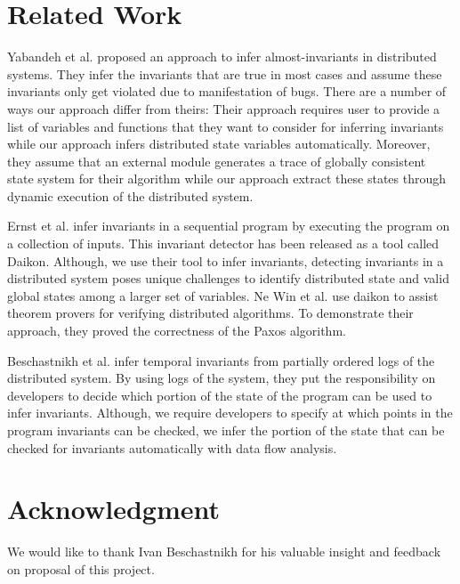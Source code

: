 \section{Related Work}

Yabandeh et al.\cite{yabandeh2011finding} proposed an approach to
infer almost-invariants in distributed systems. They infer the
invariants that are true in most cases and assume these invariants
only get violated due to manifestation of bugs. There are a number of
ways our approach differ from theirs: Their approach requires user to
provide a list of variables and functions that they want to consider
for inferring invariants while our approach infers distributed state
variables automatically. Moreover, they assume that an external module
generates a trace of globally consistent state system for their
algorithm while our approach extract these states through dynamic
execution of the distributed system.

Ernst et al.\cite{ernst2001dynamically} infer invariants in a
sequential program by executing the program on a collection of inputs.
This invariant detector has been released as a tool called
Daikon\cite{ernst2007daikon}. Although, we use their tool to infer
invariants, detecting invariants in a distributed system poses unique
challenges to identify distributed state and valid global states among
a larger set of variables. Ne Win et al.\cite{NeWinEGKL04} use daikon
to assist theorem provers for verifying distributed algorithms. To
demonstrate their approach, they proved the correctness of the Paxos
algorithm.

Beschastnikh et al. \cite{temporalInv} infer temporal invariants from partially ordered logs of the distributed system. By using logs of the system, they put the responsibility on developers to decide which portion of the state of the program can be used to infer invariants. Although, we require developers to specify at which points in the program invariants can be checked, we infer the portion of the state that can be checked for invariants automatically with data flow analysis.


\section{Acknowledgment}
We would like to thank Ivan Beschastnikh for his valuable insight and feedback on proposal of this project.